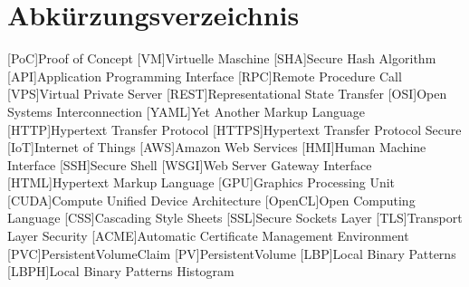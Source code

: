 \documentclass[12pt,oneside]{report}
\begin{document}
  
  
  
  
  
  
  
  

  \chapter*{Abkürzungsverzeichnis}
  \begin{acronym}
    [PoC]{Proof of Concept}
    [VM]{Virtuelle Maschine}
    [SHA]{Secure Hash Algorithm}
    [API]{Application Programming Interface}
    [RPC]{Remote Procedure Call}
    [VPS]{Virtual Private Server}
    [REST]{Representational State Transfer}
    [OSI]{Open Systems Interconnection}
    [YAML]{Yet Another Markup Language}
    [HTTP]{Hypertext Transfer Protocol}
    [HTTPS]{Hypertext Transfer Protocol Secure}
    [IoT]{Internet of Things}
    [AWS]{Amazon Web Services}
    [HMI]{Human Machine Interface}
    [SSH]{Secure Shell}
    [WSGI]{Web Server Gateway Interface}
    [HTML]{Hypertext Markup Language}
    [GPU]{Graphics Processing Unit}
    [CUDA]{Compute Unified Device Architecture}
    [OpenCL]{Open Computing Language}
    [CSS]{Cascading Style Sheets}
    [SSL]{Secure Sockets Layer}
    [TLS]{Transport Layer Security}
    [ACME]{Automatic Certificate Management Environment}
    [PVC]{PersistentVolumeClaim}
    [PV]{PersistentVolume}
    [LBP]{Local Binary Patterns}
    [LBPH]{Local Binary Patterns Histogram}
  \end{acronym}

  \newpage


  \newpage

  
  
  



  \listoffigures
  \newpage

  \lstlistoflistings
  \newpage

  
\end{document}
